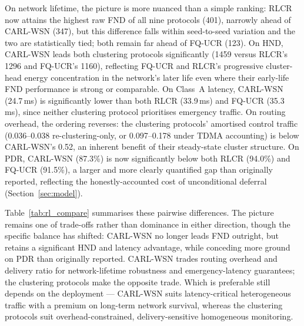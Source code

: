 \documentclass[12pt]{article}
\begin{document}
On network lifetime, the picture is more nuanced than a simple
ranking: RLCR now attains the highest raw FND of all nine protocols
(401), narrowly ahead of CARL-WSN (347), but this difference falls
within seed-to-seed variation and the two are statistically tied;
both remain far ahead of FQ-UCR (123). On HND, CARL-WSN leads both
clustering protocols significantly (1459 versus RLCR's 1296 and
FQ-UCR's 1160), reflecting FQ-UCR and RLCR's progressive
cluster-head energy concentration in the network's later life even
where their early-life FND performance is strong or comparable. On
Class~A latency, CARL-WSN (24.7\,ms) is significantly lower than
both RLCR (33.9\,ms) and FQ-UCR (35.3\,ms), since neither clustering
protocol prioritises emergency traffic. On routing overhead, the
ordering reverses: the clustering protocols' amortised control
traffic (0.036--0.038 re-clustering-only, or 0.097--0.178 under
TDMA accounting) is below CARL-WSN's 0.52, an
inherent benefit of their steady-state cluster structure. On PDR,
CARL-WSN (87.3\%) is now significantly below both RLCR (94.0\%) and
FQ-UCR (91.5\%), a larger and more clearly quantified gap than
originally reported, reflecting the honestly-accounted cost of
unconditional deferral (Section~\ref{sec:model}).

Table~\ref{tab:rl_compare} summarises these pairwise differences.
The picture remains one of trade-offs rather than dominance in
either direction, though the specific balance has shifted: CARL-WSN
no longer leads FND outright, but retains a significant HND and
latency advantage, while conceding more ground on PDR than
originally reported. CARL-WSN trades routing overhead and delivery
ratio for network-lifetime robustness and emergency-latency
guarantees; the clustering protocols make the opposite trade. Which
is preferable still depends on the deployment --- CARL-WSN suits
latency-critical heterogeneous traffic with a premium on long-term
network survival, whereas the clustering protocols suit
overhead-constrained, delivery-sensitive homogeneous monitoring.
\end{document}
